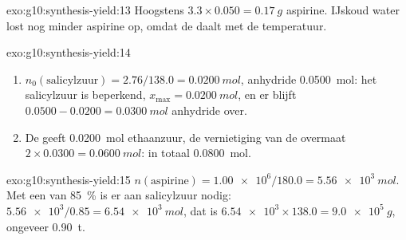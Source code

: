 \begin{solution}{exo:g10:synthesis-yield:13}
Hoogstens $3.3 \times 0.050 = \qty{0.17}{g}$ aspirine. IJskoud water lost
nog minder aspirine op, omdat de  daalt met de temperatuur.
\end{solution}

\begin{solution}{exo:g10:synthesis-yield:14}
\begin{enumerate}
  \item $n_0(\text{salicylzuur}) = 2.76 / 138.0 = \qty{0.0200}{mol}$,
        anhydride \qty{0.0500}{mol}: het salicylzuur is beperkend,
        $x_{\max} = \qty{0.0200}{mol}$, en er blijft $0.0500 - 0.0200 =
        \qty{0.0300}{mol}$ anhydride over.
  \item De  geeft \qty{0.0200}{mol} ethaanzuur, de vernietiging
        van de overmaat $2 \times 0.0300 = \qty{0.0600}{mol}$: in totaal
        \qty{0.0800}{mol}.
\end{enumerate}
\end{solution}

\begin{solution}{exo:g10:synthesis-yield:15}
$n(\text{aspirine}) = \num{1.00e6} / 180.0 = \qty{5.56e3}{mol}$. Met een
 van \qty{85}{\percent} is er aan salicylzuur nodig:
$\num{5.56e3} / 0.85 = \qty{6.54e3}{mol}$, dat is
$\num{6.54e3} \times 138.0 = \qty{9.0e5}{g}$, ongeveer \qty{0.90}{t}.
\end{solution}

